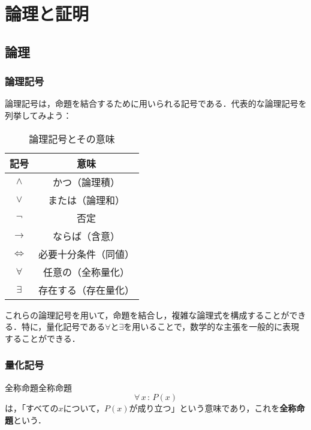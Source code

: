\documentclass[a4paper,11pt]{ltjsarticle}
\renewcommand{\emph}[1]{\textbf{#1}}
\begin{document}
\newpage 

\section{論理と証明}
\subsection{論理}
\subsubsection{論理記号}

	論理記号は，命題を結合するために用いられる記号である．代表的な論理記号を列挙してみよう：

	\begin{table}[ht]
		\centering
		\caption{論理記号とその意味}
		\begin{tabular}{c|c}
		\hline
		記号 & 意味 \\
		\hline
    $\land$ & かつ（論理積\index{ろんりせき@論理積}） \\
    $\lor$ & または（論理和\index{ろんりわ@論理和}） \\
    $\lnot$ & 否定\index{ひてい@否定} \\
    $\to$ & ならば（含意\index{がんい@含意}） \\
    $\Leftrightarrow$ & 必要十分条件（同値）\index{どうち@同値} \\
    $\forall$ & 任意の（全称量化\index{ぜんしょうりょうか@全称量化}） \\
    $\exists$ & 存在する（存在量化\index{そんざいりょうか@存在量化}） \\
		\hline
		\end{tabular}
		\end{table}

    これらの論理記号を用いて，命題を結合し，複雑な論理式を構成することができる．特に，量化記号である$\forall$と$\exists$を用いることで，数学的な主張を一般的に表現することができる．

    \subsubsection{量化記号}
    
    \begin{definition}{全称命題}{全称命題}
        \[
          \forall\, x \, : \, P(x)
        \]
        は，「すべての$x$について，$P(x)$が成り立つ」という意味であり，これを\emph{全称命題}という．
    \end{definition}
    
\end{document}

